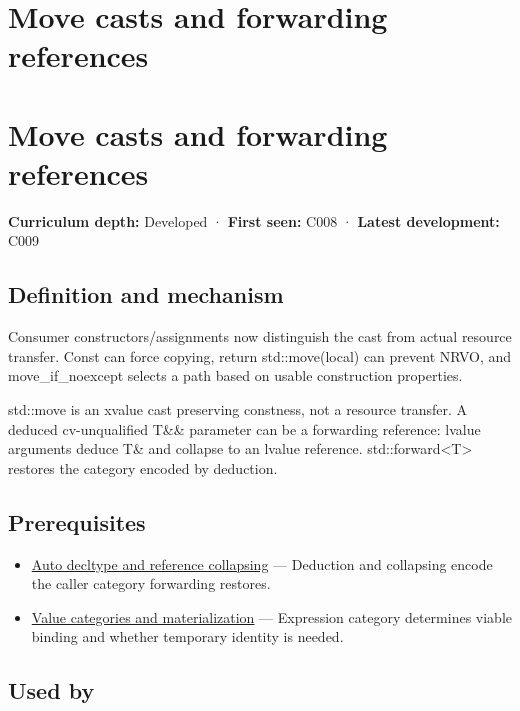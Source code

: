 \hypertarget{appendix-0104b704fb11}{}
\section*{Move casts and forwarding references}
\section{Move casts and forwarding references}\label{move-casts-and-forwarding-references}

\textbf{Curriculum depth:} Developed · \textbf{First seen:} C008 · \textbf{Latest development:} C009

\subsection{Definition and mechanism}\label{definition-and-mechanism}

Consumer constructors/assignments now distinguish the cast from actual resource transfer. Const can force copying, return std::move(local) can prevent NRVO, and move\_if\_noexcept selects a path based on usable construction properties.

std::move is an xvalue cast preserving constness, not a resource transfer. A deduced cv-unqualified T\&\& parameter can be a forwarding reference: lvalue arguments deduce T\& and collapse to an lvalue reference. std::forward\textless T\textgreater{} restores the category encoded by deduction.

\subsection{Prerequisites}\label{prerequisites}

\begin{itemize}
\tightlist
\item
  \hyperref[appendix-5d4252a42886]{Auto decltype and reference collapsing} --- Deduction and collapsing encode the caller category forwarding restores.
\item
  \hyperref[appendix-1121b30eaeb0]{Value categories and materialization} --- Expression category determines viable binding and whether temporary identity is needed.
\end{itemize}

\subsection{Used by}\label{used-by}

